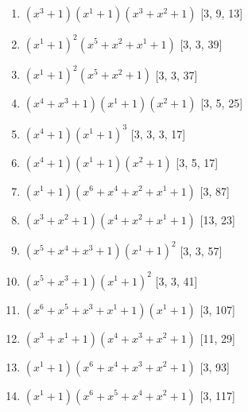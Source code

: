 \documentclass[10pt,twocolumn]{article}
\begin{document}
\begin{enumerate}
\item $(x^{3} + 1)(x^{1} + 1)(x^{3} + x^{2} + 1)$  [3, 9, 13]
\item $(x^{1} + 1)^{2}(x^{5} + x^{2} + x^{1} + 1)$  [3, 3, 39]
\item $(x^{1} + 1)^{2}(x^{5} + x^{2} + 1)$  [3, 3, 37]
\item $(x^{4} + x^{3} + 1)(x^{1} + 1)(x^{2} + 1)$  [3, 5, 25]
\item $(x^{4} + 1)(x^{1} + 1)^{3}$  [3, 3, 3, 17]
\item $(x^{4} + 1)(x^{1} + 1)(x^{2} + 1)$  [3, 5, 17]
\item $(x^{1} + 1)(x^{6} + x^{4} + x^{2} + x^{1} + 1)$  [3, 87]
\item $(x^{3} + x^{2} + 1)(x^{4} + x^{2} + x^{1} + 1)$  [13, 23]
\item $(x^{5} + x^{4} + x^{3} + 1)(x^{1} + 1)^{2}$  [3, 3, 57]
\item $(x^{5} + x^{3} + 1)(x^{1} + 1)^{2}$  [3, 3, 41]
\item $(x^{6} + x^{5} + x^{3} + x^{1} + 1)(x^{1} + 1)$  [3, 107]
\item $(x^{3} + x^{1} + 1)(x^{4} + x^{3} + x^{2} + 1)$  [11, 29]
\item $(x^{1} + 1)(x^{6} + x^{4} + x^{3} + x^{2} + 1)$  [3, 93]
\item $(x^{1} + 1)(x^{6} + x^{5} + x^{4} + x^{2} + 1)$  [3, 117]
\end{enumerate}
\end{document}
